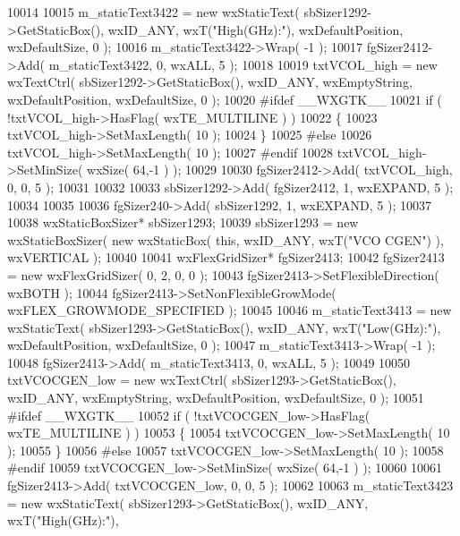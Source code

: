 \begin{DoxyCode}
10014     
10015     m_staticText3422 = \textcolor{keyword}{new} wxStaticText( sbSizer1292->GetStaticBox(), wxID\_ANY, wxT(\textcolor{stringliteral}{"High(GHz):"}), 
      wxDefaultPosition, wxDefaultSize, 0 );
10016     m_staticText3422->Wrap( -1 );
10017     fgSizer2412->Add( m_staticText3422, 0, wxALL, 5 );
10018     
10019     txtVCOL_high = \textcolor{keyword}{new} wxTextCtrl( sbSizer1292->GetStaticBox(), wxID\_ANY, wxEmptyString, wxDefaultPosition,
       wxDefaultSize, 0 );
10020 \textcolor{preprocessor}{    #ifdef \_\_WXGTK\_\_}
10021     \textcolor{keywordflow}{if} ( !txtVCOL_high->HasFlag( wxTE\_MULTILINE ) )
10022     \{
10023     txtVCOL_high->SetMaxLength( 10 );
10024     \}
10025 \textcolor{preprocessor}{    #else}
10026     txtVCOL_high->SetMaxLength( 10 );
10027 \textcolor{preprocessor}{    #endif}
10028     txtVCOL_high->SetMinSize( wxSize( 64,-1 ) );
10029     
10030     fgSizer2412->Add( txtVCOL_high, 0, 0, 5 );
10031     
10032     
10033     sbSizer1292->Add( fgSizer2412, 1, wxEXPAND, 5 );
10034     
10035     
10036     fgSizer240->Add( sbSizer1292, 1, wxEXPAND, 5 );
10037     
10038     wxStaticBoxSizer* sbSizer1293;
10039     sbSizer1293 = \textcolor{keyword}{new} wxStaticBoxSizer( \textcolor{keyword}{new} wxStaticBox( \textcolor{keyword}{this}, wxID\_ANY, wxT(\textcolor{stringliteral}{"VCO CGEN"}) ), wxVERTICAL );
10040     
10041     wxFlexGridSizer* fgSizer2413;
10042     fgSizer2413 = \textcolor{keyword}{new} wxFlexGridSizer( 0, 2, 0, 0 );
10043     fgSizer2413->SetFlexibleDirection( wxBOTH );
10044     fgSizer2413->SetNonFlexibleGrowMode( wxFLEX\_GROWMODE\_SPECIFIED );
10045     
10046     m_staticText3413 = \textcolor{keyword}{new} wxStaticText( sbSizer1293->GetStaticBox(), wxID\_ANY, wxT(\textcolor{stringliteral}{"Low(GHz):"}), 
      wxDefaultPosition, wxDefaultSize, 0 );
10047     m_staticText3413->Wrap( -1 );
10048     fgSizer2413->Add( m_staticText3413, 0, wxALL, 5 );
10049     
10050     txtVCOCGEN_low = \textcolor{keyword}{new} wxTextCtrl( sbSizer1293->GetStaticBox(), wxID\_ANY, wxEmptyString, 
      wxDefaultPosition, wxDefaultSize, 0 );
10051 \textcolor{preprocessor}{    #ifdef \_\_WXGTK\_\_}
10052     \textcolor{keywordflow}{if} ( !txtVCOCGEN_low->HasFlag( wxTE\_MULTILINE ) )
10053     \{
10054     txtVCOCGEN_low->SetMaxLength( 10 );
10055     \}
10056 \textcolor{preprocessor}{    #else}
10057     txtVCOCGEN_low->SetMaxLength( 10 );
10058 \textcolor{preprocessor}{    #endif}
10059     txtVCOCGEN_low->SetMinSize( wxSize( 64,-1 ) );
10060     
10061     fgSizer2413->Add( txtVCOCGEN_low, 0, 0, 5 );
10062     
10063     m_staticText3423 = \textcolor{keyword}{new} wxStaticText( sbSizer1293->GetStaticBox(), wxID\_ANY, wxT(\textcolor{stringliteral}{"High(GHz):"}), 

\end{DoxyCode}
